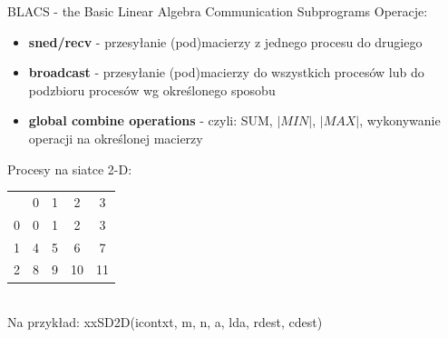 	\begin{frame}{BLACS - the Basic Linear Algebra Communication Subprograms}
		Operacje: 
		\begin{itemize}
			\item	\textbf{sned/recv} - przesyłanie (pod)macierzy z jednego procesu do drugiego
			\item \textbf{broadcast} - przesyłanie (pod)macierzy do wszystkich procesów lub do podzbioru procesów wg określonego sposobu
			\item \textbf{global combine operations} - czyli: SUM, $|MIN|$, $|MAX|$, wykonywanie operacji na określonej macierzy
		\end{itemize}
		Procesy na siatce 2-D:
		\begin{tabular}{ c|c|c|c|c| }
			\multicolumn{1}{c}{} & \multicolumn{1}{c}{0} & \multicolumn{1}{c}{1} & \multicolumn{1}{c}{2} & \multicolumn{1}{c}{3} \\
			\cline{2-5} 0 & 0 & 1 & 2 & 3 \\
			\cline{2-5} 1 & 4 & 5 & 6 & 7 \\
			\cline{2-5} 2 & 8 & 9 & 10 & 11 \\
			\cline{2-5}
		\end{tabular} \\
		Na przykład: xxSD2D(icontxt, m, n, a, lda, rdest, cdest)
	\end{frame}
	
